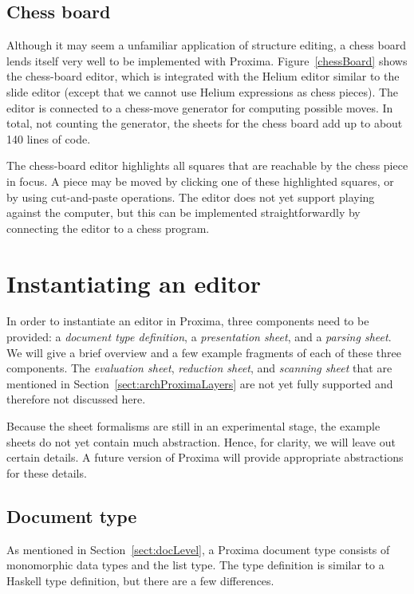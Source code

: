 \subsection{Chess board}

Although it may seem a unfamiliar application of structure editing, a chess board lends itself very well to be implemented with Proxima.  Figure~\ref{chessBoard} shows the chess-board editor, which is integrated with the Helium editor similar to the slide editor (except that we cannot use Helium expressions as chess pieces). The editor is connected to a chess-move generator for computing possible moves. In total, not counting the generator, the sheets for the chess board add up to about 140 lines of code.


The chess-board editor highlights all squares that are reachable by the chess piece in focus. A piece may be moved by clicking one of these highlighted squares, or by using cut-and-paste operations. The editor does not yet support playing against the computer, but this can be implemented straightforwardly by connecting the editor to a chess program. 


%																
%																
%																
\section{Instantiating an editor} \label{sect:instantiating}

In order to instantiate an editor in Proxima, three components need to be provided: a {\em document type definition}, a {\em presentation sheet}, and a {\em parsing sheet}. We will give a brief overview and a few example fragments of each of these three components. The {\em evaluation sheet}, {\em reduction sheet}, and {\em scanning sheet} that are mentioned in Section~\ref{sect:archProximaLayers} are not yet fully supported and therefore not discussed here.

Because the sheet formalisms are still in an experimental stage, the example sheets do not yet contain much abstraction. Hence, for clarity, we will leave out certain details. A future version of Proxima will provide appropriate abstractions for these details. 

\subsection{Document type}

As mentioned in Section~\ref{sect:docLevel}, a Proxima document type consists of monomorphic data types and the list type. The type definition is similar to a Haskell type definition, but there are a few differences. 

